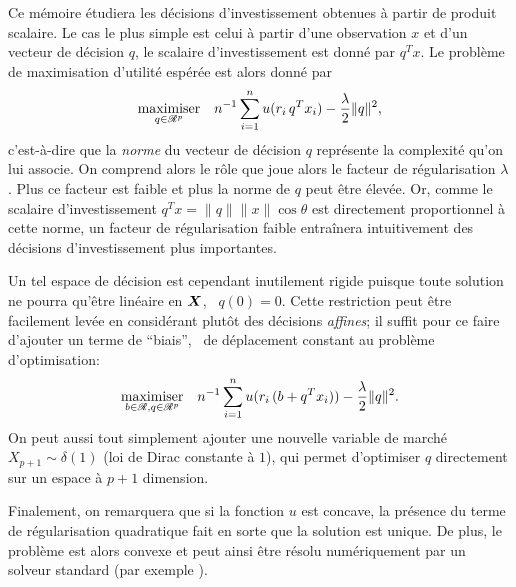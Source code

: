 Ce mémoire étudiera les décisions d'investissement obtenues à partir de produit
scalaire. Le cas le plus simple est celui à partir d'une observation $x$ et d'un vecteur
de décision $q$, le scalaire d'investissement est donné par $q^Tx$. Le problème de
maximisation d'utilité espérée est alors donné par
\begin{equation}
  \label{intro:he}
  \maximizeEquation[q \in \Re^p]{n^{-1}\sumi u(r_i\,q^Tx_i) - \frac{\lambda}{2}\|q\|^2,}
\end{equation}
c'est-à-dire que la \textit{norme} du vecteur de décision $q$ représente la complexité
qu'on lui associe. On comprend alors le rôle que joue alors le facteur de régularisation
$\lambda$. Plus ce facteur est faible et plus la norme de $q$ peut être élevée. Or, comme le
scalaire d'investissement $q^Tx = \|q\|\|x\|\cos\theta$ est directement proportionnel à cette
norme, un facteur de régularisation faible entraînera intuitivement des décisions
d'investissement plus importantes.

Un tel espace de décision est cependant inutilement rigide puisque toute solution ne
pourra qu'être linéaire en $\X$, \ie\ $q(0) = 0$. Cette restriction peut être facilement
levée en considérant plutôt des décisions \textit{affines}; il suffit pour ce faire
d'ajouter un terme de ``biais'', \ie\ de déplacement constant au problème d'optimisation:
\begin{equation}
  \maximizeEquation[b \in \Re, q \in \Re^p]{n^{-1}\sumi u(r_i\,(b + q^Tx_i)) - \frac{\lambda}{2}\|q\|^2.}
\end{equation}
On peut aussi tout simplement ajouter une nouvelle variable de marché
$X_{p+1} \sim \delta(1)$ (loi de Dirac constante à $1$), qui permet d'optimiser $q$ directement
sur un espace à $p+1$ dimension.

Finalement, on remarquera que si la fonction $u$ est concave, la présence du terme de
régularisation quadratique fait en sorte que la solution est unique. De plus, le problème
est alors convexe et peut ainsi être résolu numériquement par un solveur standard (par
exemple \cite{cvx,gb08}).

